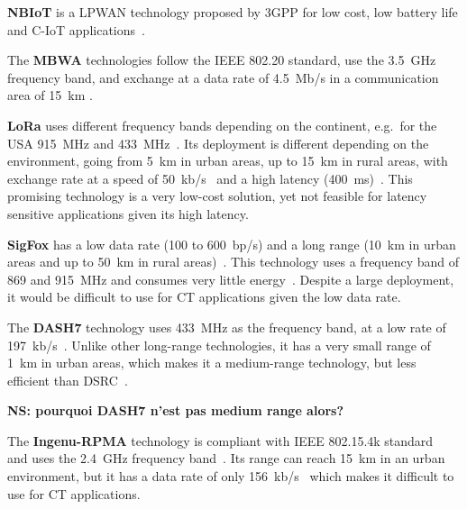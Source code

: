 \textbf{\acrfull{NBIoT}} is a \acrfull{LPWAN} technology proposed by 3GPP for low cost, low battery life and \acrfull{C-IoT} applications~\cite{qadir_low_201818,sudhir21}.

The \textbf{\acrfull{MBWA}} technologies follow the IEEE 802.20 standard, use the 3.5~GHz frequency band, and exchange at a data rate of 4.5~Mb/s in a communication area of 15~km \cite{anwer_survey_2014}.


\textbf{\acrfull{LoRa}} uses different frequency bands depending on the continent, e.g.\ for the USA 915~MHz and 433~MHz~\cite{li_lora_2018}. Its deployment is different depending on the environment, going from 5~km in urban areas, up to 15~km in rural areas, with exchange rate at a speed of 50~kb/s~\cite{foubert_long-range_2020, queralta_comparative_2019} and a high latency (400~ms)~\cite{potsch_towards_2019}. This promising technology is a very low-cost solution, yet not feasible for latency sensitive applications given its high latency.

\textbf{SigFox} has a low data rate (100 to 600~bp/s) and a long range (10~km in urban areas and up to 50~km in rural areas)~\cite{potsch_towards_2019}. This technology uses a frequency band of 869 and 915~MHz and consumes very little energy~\cite{akpakwu_survey_2018}. Despite a large deployment, it would be difficult to use for \acrshort{CT} applications given the low data rate. 

The \textbf{DASH7} technology uses 433~MHz as the frequency band, at a low rate of 197~kb/s~\cite{akpakwu_survey_2018}. Unlike other long-range technologies, it has a very small range of 1~km in urban areas, which makes it a medium-range technology, but less efficient than \acrshort{DSRC}~\cite{foubert_long-range_2020}.

{\bf NS: pourquoi DASH7 n'est pas medium range alors?}

The \textbf{Ingenu-RPMA} technology is compliant with IEEE 802.15.4k standard~\cite{akpakwu_survey_2018} and uses the 2.4~GHz frequency band~\cite{foubert_long-range_2020}. 
Its range can reach 15~km in an urban environment, but it has a data rate of only 156~kb/s~\cite{foubert_long-range_2020} which makes it difficult to use for \acrshort{CT} applications. %

